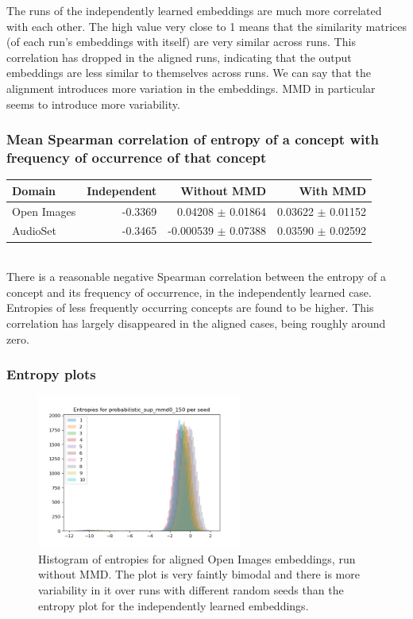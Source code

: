 The runs of the independently learned embeddings are much more correlated with each other. The high value very close to 1 means that the similarity matrices (of each run's embeddings with itself) are very similar across runs. This correlation has dropped in the aligned runs, indicating that the output embeddings are less similar to themselves across runs. We can say that the alignment introduces more variation in the embeddings. MMD in particular seems to introduce more variability. 


\subsubsection{Mean Spearman correlation of entropy of a concept with frequency of occurrence of that concept}
\begin{tabular}{lrrr}
\toprule
Domain &   Independent & Without MMD &  With MMD \\
\midrule
Open Images    &  -0.3369 & 0.04208 $\pm$ 0.01864 &     0.03622 $\pm$  0.01152 \\
AudioSet    &  -0.3465 & -0.000539 $\pm$   0.07388 &      0.03590  $\pm$ 0.02592  \\
\bottomrule
\end{tabular}\\

There is a reasonable negative Spearman correlation between the entropy of a concept and its frequency of occurrence, in the independently learned case. Entropies of less frequently occurring concepts are found to be higher. This correlation has largely disappeared in the aligned cases, being roughly around zero. 

\newpage
\subsubsection{Entropy plots}

\begin{figure}[H]
    \centering
    \includegraphics[width=0.6\textwidth]{images/method/probabilistic_aligned/openimages/probabilistic_sup_mmd0_150_entropies.png}
    \caption{
        Histogram of entropies for aligned Open Images embeddings, run without MMD. The plot is very faintly bimodal and there is more variability in it over runs with different random seeds than the entropy plot for the independently learned embeddings. 
    }
\end{figure}

